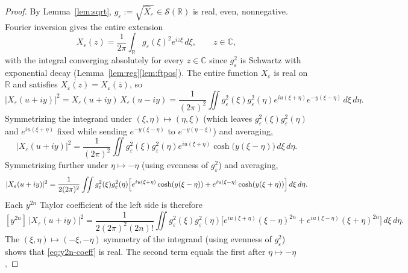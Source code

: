 \documentclass[12pt]{amsart}
\theoremstyle{remark}
\begin{document}
\begin{proof}
By Lemma~\ref{lem:sqrt}, $g_\varepsilon:=\sqrt{\hat X_\varepsilon}
\in\mathcal{S}(\mathbb{R})$ is real, even, nonnegative.  Fourier
inversion gives the entire extension
\begin{equation}\label{eq:Xeps-int}
  X_\varepsilon(z)
  =\frac{1}{2\pi}\int_\mathbb{R}g_\varepsilon(\xi)^2 e^{iz\xi}\,d\xi,
  \qquad z\in\mathbb{C},
\end{equation}
with the integral converging absolutely for every $z\in\mathbb{C}$
since $g_\varepsilon^2$ is Schwartz with exponential decay
(Lemma~\ref{lem:reg}\ref{lem:ftpos}).  The entire function
$X_\varepsilon$ is real on $\mathbb{R}$ and satisfies
$\overline{X_\varepsilon(z)}=X_\varepsilon(\bar z)$, so
\begin{equation}\label{eq:modsq-int}
  |X_\varepsilon(u+iy)|^2
  =X_\varepsilon(u+iy)\,X_\varepsilon(u-iy)
  =\frac{1}{(2\pi)^2}\iint g_\varepsilon^2(\xi)g_\varepsilon^2(\eta)
   e^{iu(\xi+\eta)}e^{-y(\xi-\eta)}\,d\xi\,d\eta.
\end{equation}
Symmetrizing the integrand under $(\xi,\eta)\mapsto(\eta,\xi)$
(which leaves $g_\varepsilon^2(\xi)g_\varepsilon^2(\eta)$ and
$e^{iu(\xi+\eta)}$ fixed while sending $e^{-y(\xi-\eta)}$ to
$e^{-y(\eta-\xi)}$) and averaging,
\begin{equation}\label{eq:sym1}
  |X_\varepsilon(u+iy)|^2
  =\frac{1}{(2\pi)^2}\iint g_\varepsilon^2(\xi)g_\varepsilon^2(\eta)
   e^{iu(\xi+\eta)}\cosh\!\bigl(y(\xi-\eta)\bigr)\,d\xi\,d\eta.
\end{equation}
Symmetrizing further under $\eta\mapsto-\eta$ (using evenness of
$g_\varepsilon^2$) and averaging,
\begin{equation}\label{eq:sym2}
  |X_\varepsilon(u+iy)|^2
  =\frac{1}{2(2\pi)^2}\iint g_\varepsilon^2(\xi)g_\varepsilon^2(\eta)
   \Bigl[e^{iu(\xi+\eta)}\cosh(y(\xi-\eta))
       + e^{iu(\xi-\eta)}\cosh(y(\xi+\eta))\Bigr]\,d\xi\,d\eta.
\end{equation}
Each $y^{2n}$ Taylor coefficient of the left side is therefore
\begin{equation}\label{eq:y2n-coeff}
  [y^{2n}]\,|X_\varepsilon(u+iy)|^2
  =\frac{1}{2(2\pi)^2(2n)!}\iint g_\varepsilon^2(\xi)g_\varepsilon^2(\eta)
   \bigl[e^{iu(\xi+\eta)}(\xi-\eta)^{2n}
        +e^{iu(\xi-\eta)}(\xi+\eta)^{2n}\bigr]\,d\xi\,d\eta.
\end{equation}
The $(\xi,\eta)\mapsto(-\xi,-\eta)$ symmetry of the integrand
(using evenness of $g_\varepsilon^2$) shows that \eqref{eq:y2n-coeff}
is real.  The second term equals the first after $\eta\mapsto-\eta$,

\end{proof}
\end{document}
